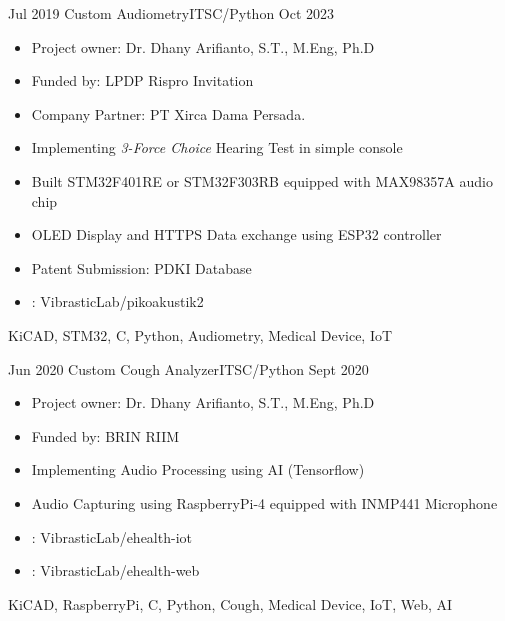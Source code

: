 %
%



\begin{experiences}

    \experience
	{Jul 2019} {Custom Audiometry}{ITS}{C/Python}
	{Oct 2023} {
        \begin{itemize}
            \item Project owner: Dr. Dhany Arifianto, S.T., M.Eng, Ph.D
            \item Funded by: LPDP Rispro Invitation
            \item Company Partner: PT Xirca Dama Persada.
            \item Implementing \textit{3-Force Choice} Hearing Test in simple console
	    \item Built STM32F401RE or STM32F303RB equipped with MAX98357A audio chip
	    \item OLED Display and HTTPS Data exchange using ESP32 controller
            \item Patent Submission:  {PDKI Database}
	    \item \faGithub:  {VibrasticLab/pikoakustik2}
	\end{itemize}
    }
    {KiCAD, STM32, C, Python, Audiometry, Medical Device, IoT}

    \emptySeparator
	\experience
	{Jun 2020} {Custom Cough Analyzer}{ITS}{C/Python}
	{Sept 2020} {
	\begin{itemize}
            \item Project owner: Dr. Dhany Arifianto, S.T., M.Eng, Ph.D
            \item Funded by: BRIN RIIM
	    \item Implementing Audio Processing using AI (Tensorflow)
	    \item Audio Capturing using RaspberryPi-4 equipped with INMP441 Microphone
	    \item \faGithub:  {VibrasticLab/ehealth-iot}
	    \item \faGithub:  {VibrasticLab/ehealth-web}
	\end{itemize}
    }
    {KiCAD, RaspberryPi, C, Python, Cough, Medical Device, IoT, Web, AI}

\end{experiences}
